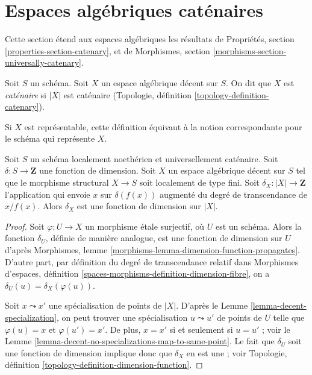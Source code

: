 \section{Espaces algébriques caténaires}
\label{section-catenary}

\noindent
Cette section étend aux espaces algébriques les résultats de Propriétés,
section \ref{properties-section-catenary}, et de Morphismes, section
\ref{morphisms-section-universally-catenary}.

\begin{definition}
\label{definition-catenary}
Soit $S$ un schéma. Soit $X$ un espace algébrique décent sur $S$.
On dit que $X$ est {\it caténaire} si $|X|$ est caténaire
(Topologie, définition \ref{topology-definition-catenary}).
\end{definition}

\noindent
Si $X$ est représentable, cette définition équivaut à la notion
correspondante pour le schéma qui représente $X$.

\begin{lemma}
\label{lemma-scheme-with-dimension-function}
Soit $S$ un schéma localement noethérien et universellement caténaire.
Soit $\delta : S \to \mathbf{Z}$ une fonction de dimension.
Soit $X$ un espace algébrique décent sur $S$ tel que le morphisme structural
$X \to S$ soit localement de type fini. Soit
$\delta_X : |X| \to \mathbf{Z}$ l'application qui envoie $x$ sur
$\delta(f(x))$ augmenté du degré de transcendance de $x/f(x)$.
Alors $\delta_X$ est une fonction de dimension sur $|X|$.
\end{lemma}

\begin{proof}
Soit $\varphi : U \to X$ un morphisme étale surjectif, où $U$ est un schéma.
Alors la fonction $\delta_U$, définie de manière analogue, est une fonction
de dimension sur $U$ d'après Morphismes, lemme
\ref{morphisms-lemma-dimension-function-propagates}.
D'autre part, par définition du degré de transcendance relatif dans
Morphismes d'espaces, définition
\ref{spaces-morphisms-definition-dimension-fibre}, on a
$\delta_U(u) = \delta_X(\varphi(u))$.

\medskip\noindent
Soit $x \leadsto x'$ une spécialisation de points de $|X|$.
D'après le Lemme \ref{lemma-decent-specialization}, on peut trouver une
spécialisation $u \leadsto u'$ de points de $U$ telle que
$\varphi(u) = x$ et $\varphi(u') = x'$. De plus, $x = x'$ si et seulement si
$u = u'$ ; voir le
Lemme \ref{lemma-decent-no-specializations-map-to-same-point}.
Le fait que $\delta_U$ soit une fonction de dimension implique donc que
$\delta_X$ en est une ; voir Topologie, définition
\ref{topology-definition-dimension-function}.
\end{proof}

